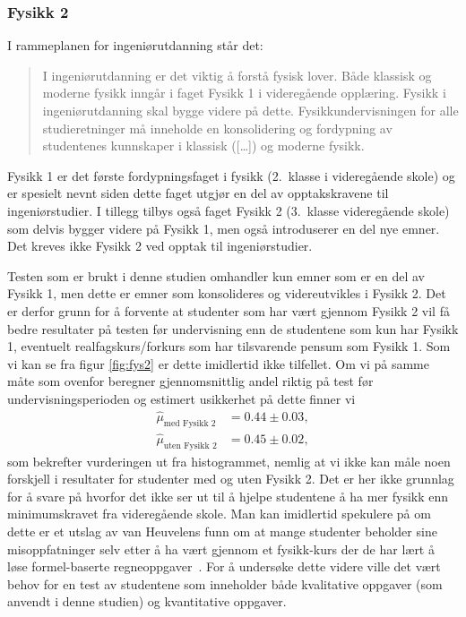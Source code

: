 \documentclass[a4paper,norsk,12pt]{article}
\begin{document}
\subsubsection{Fysikk 2}
I rammeplanen for ingeniørutdanning \cite{rammeplan} står det:
\begin{quote}I ingeniørutdanning er det viktig å forstå fysisk lover. Både klassisk og moderne fysikk inngår i faget Fysikk 1 i videregående opplæring. Fysikk i ingeniørutdanning skal bygge videre på dette. Fysikkundervisningen for alle studieretninger må inneholde en konsolidering og fordypning av studentenes kunnskaper i klassisk ([\ldots]) og moderne fysikk.\end{quote}
Fysikk 1 er det første fordypningsfaget i fysikk (2.~klasse i videregående skole) og er spesielt nevnt siden dette faget utgjør en del av opptakskravene til ingeniørstudier. I tillegg tilbys også faget Fysikk 2 (3.~klasse videregående skole) som delvis bygger videre på Fysikk 1, men også introduserer en del nye emner. Det kreves ikke Fysikk 2 ved opptak til ingeniørstudier. 

Testen som er brukt i denne studien omhandler kun emner som er en del av Fysikk 1, men dette er emner som konsolideres og videreutvikles i Fysikk 2. Det er derfor grunn for å forvente at studenter som har vært gjennom Fysikk 2 vil få bedre resultater på testen før undervisning enn de studentene som kun har Fysikk 1, eventuelt realfagskurs/forkurs som har tilsvarende pensum som Fysikk 1. Som vi kan se fra figur \ref{fig:fys2} er dette imidlertid ikke tilfellet. Om vi på samme måte som ovenfor beregner gjennomsnittlig andel riktig på test før undervisningsperioden og estimert usikkerhet på dette finner vi
\begin{displaymath}
\begin{aligned}
	\hat{\mu}_\text{med Fysikk 2} &= 0.44\pm 0.03, \\
	\hat{\mu}_\text{uten Fysikk 2} &= 0.45\pm 0.02,
\end{aligned}
\end{displaymath}
som bekrefter vurderingen ut fra histogrammet, nemlig at vi ikke kan måle noen forskjell i resultater for studenter med og uten Fysikk 2. Det er her ikke grunnlag for å svare på hvorfor det ikke ser ut til å hjelpe studentene å ha mer fysikk enn minimumskravet fra videregående skole. Man kan imidlertid spekulere på om dette er et utslag av van Heuvelens funn om at mange studenter beholder sine misoppfatninger selv etter å ha vært gjennom et fysikk-kurs der de har lært å løse formel-baserte regneoppgaver~\cite{1991AmJPh..59..891V}. For å undersøke dette videre ville det vært behov for en test av studentene som inneholder både kvalitative oppgaver (som anvendt i denne studien) og kvantitative oppgaver.
\end{document}

